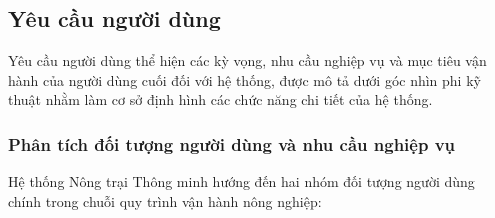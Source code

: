 \subsection{Yêu cầu người dùng}

Yêu cầu người dùng thể hiện các kỳ vọng, nhu cầu nghiệp vụ và mục tiêu vận hành của người dùng cuối đối với hệ thống, được mô tả dưới góc nhìn phi kỹ thuật nhằm làm cơ sở định hình các chức năng chi tiết của hệ thống.

\subsubsection{Phân tích đối tượng người dùng và nhu cầu nghiệp vụ}

Hệ thống Nông trại Thông minh hướng đến hai nhóm đối tượng người dùng chính trong chuỗi quy trình vận hành nông nghiệp:

